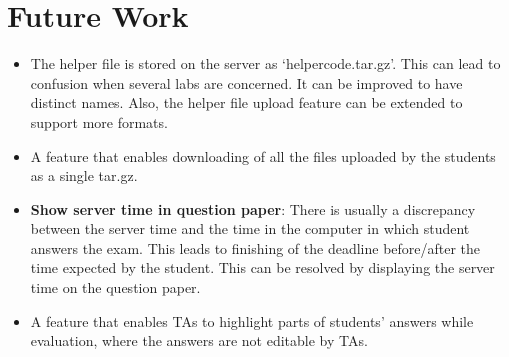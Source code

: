 \section{Future Work}

\begin{itemize}
\item The helper file is stored on the server as `helpercode.tar.gz'. This can lead to confusion when several labs are concerned. It can be improved to have distinct names. Also, the helper file upload feature can be extended to support more formats.

\item A feature that enables downloading of all the files uploaded by the students as a single tar.gz.

\item \textbf{Show server time in question paper}: There is usually a discrepancy between the server time and the time in the computer in which student answers the exam. This leads to finishing of the deadline before/after the time expected by the student. This can be resolved by displaying the server time on the question paper.

\item A feature that enables TAs to highlight parts of students' answers while evaluation, where the answers are not editable by TAs.
\end{itemize}